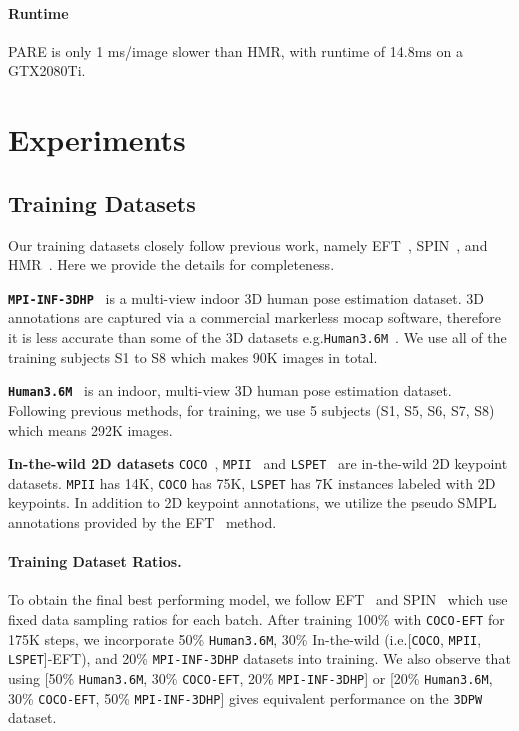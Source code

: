 \documentclass[10pt,twocolumn,letterpaper,usenames,dvipsnames]{article}
\newcommand{\mpi}{\texttt{MPI-INF-3DHP}\xspace}
\newcommand{\mpii}{\texttt{MPII}\xspace}
\newcommand{\lspet}{\texttt{LSPET}\xspace}
\newcommand{\hthreesixm}{\texttt{Human3.6M}\xspace}
\newcommand{\threedpw}{\texttt{3DPW}\xspace}
\newcommand{\coco}{\texttt{COCO}\xspace}
\newcommand{\cocoeft}{\texttt{COCO-EFT}\xspace}
\renewcommand{\ie}{i.e.\xspace}
\renewcommand{\eg}{e.g.\xspace}
\begin{document}
\paragraph{Runtime} PARE is only 1 ms/image slower than HMR, with runtime of 14.8ms on a GTX2080Ti. 

\section{Experiments}
\subsection{Training Datasets}
Our training datasets closely follow previous work, namely EFT~\cite{joo2020eft}, SPIN~\cite{SPIN:ICCV:2019}, and HMR~\cite{kanazawa_hmr}. Here we provide the details for completeness.

\noindent\textbf{\mpi}~\cite{mpiiinf3dhp_mono-2017} is a multi-view indoor 3D human pose estimation dataset. 3D annotations are captured via a commercial markerless mocap software, therefore it is less accurate than some of the 3D datasets \eg \hthreesixm~\cite{ionescu_h36m}. We use all of the training subjects S1 to S8 which makes 90K images in total.

\noindent\textbf{\hthreesixm}~\cite{ionescu_h36m} is an indoor, multi-view 3D human pose estimation dataset. Following previous methods, for training, we use 5 subjects (S1, S5, S6, S7, S8) which means 292K images.

\noindent\textbf{In-the-wild 2D datasets} \coco~\cite{coco}, \mpii~\cite{mpii} and \lspet~\cite{lspet} are in-the-wild 2D keypoint datasets. \mpii has 14K, \coco has 75K, \lspet has 7K instances labeled with 2D keypoints. In addition to 2D keypoint annotations, we utilize the pseudo SMPL annotations provided by the EFT~\cite{joo2020eft} method.

\paragraph{Training Dataset Ratios.}
To obtain the final best performing model, we follow EFT~\cite{joo2020eft} and SPIN~\cite{SPIN:ICCV:2019} which use fixed data sampling ratios for each batch. After training 100\% with \cocoeft for 175K steps, we incorporate 50\% \hthreesixm, 30\% In-the-wild (\ie [\coco, \mpii, \lspet]-EFT), and 20\% \mpi datasets into training. We also observe that using [50\% \hthreesixm, 30\% \cocoeft, 20\% \mpi] or [20\% \hthreesixm, 30\% \cocoeft, 50\% \mpi] gives equivalent performance on the \threedpw dataset.
\end{document}

